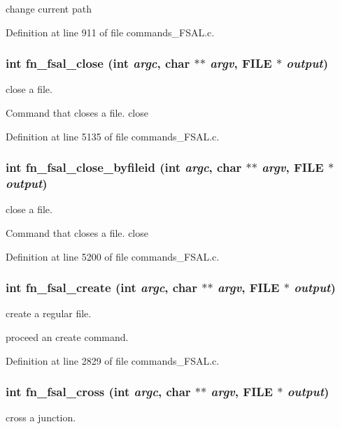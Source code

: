 change current path 

Definition at line 911 of file commands\_\-FSAL.c.
\subsubsection[{fn\_\-fsal\_\-close}]{\setlength{\rightskip}{0pt plus 5cm}int fn\_\-fsal\_\-close (int {\em argc}, \/  char $\ast$$\ast$ {\em argv}, \/  FILE $\ast$ {\em output})}\label{commands_8h_a1dfe4ba6cf12309c66972b4beb736f49}
close a file.

Command that closes a file. close 

Definition at line 5135 of file commands\_\-FSAL.c.
\subsubsection[{fn\_\-fsal\_\-close\_\-byfileid}]{\setlength{\rightskip}{0pt plus 5cm}int fn\_\-fsal\_\-close\_\-byfileid (int {\em argc}, \/  char $\ast$$\ast$ {\em argv}, \/  FILE $\ast$ {\em output})}\label{commands_8h_add966799be6a18249b7fa33d65d49ccf}
close a file.

Command that closes a file. close 

Definition at line 5200 of file commands\_\-FSAL.c.
\subsubsection[{fn\_\-fsal\_\-create}]{\setlength{\rightskip}{0pt plus 5cm}int fn\_\-fsal\_\-create (int {\em argc}, \/  char $\ast$$\ast$ {\em argv}, \/  FILE $\ast$ {\em output})}\label{commands_8h_a3bce309b30ce91cedd92062521d09b4d}
create a regular file.

proceed an create command. 

Definition at line 2829 of file commands\_\-FSAL.c.
\subsubsection[{fn\_\-fsal\_\-cross}]{\setlength{\rightskip}{0pt plus 5cm}int fn\_\-fsal\_\-cross (int {\em argc}, \/  char $\ast$$\ast$ {\em argv}, \/  FILE $\ast$ {\em output})}\label{commands_8h_a87895e361f769c6c2e3679db5be9ad81}
cross a junction.

